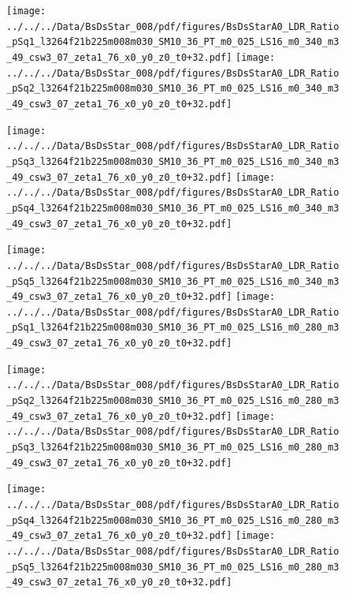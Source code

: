 \documentclass[a4paper,10pt]{article}
\begin{document}
\begin{figure}[p]
 \texttt{[image: ../../../Data/BsDsStar\_008/pdf/figures/BsDsStarA0\_LDR\_Ratio\_pSq1\_l3264f21b225m008m030\_SM10\_36\_PT\_m0\_025\_LS16\_m0\_340\_m3\_49\_csw3\_07\_zeta1\_76\_x0\_y0\_z0\_t0+32.pdf]} 
 \texttt{[image: ../../../Data/BsDsStar\_008/pdf/figures/BsDsStarA0\_LDR\_Ratio\_pSq2\_l3264f21b225m008m030\_SM10\_36\_PT\_m0\_025\_LS16\_m0\_340\_m3\_49\_csw3\_07\_zeta1\_76\_x0\_y0\_z0\_t0+32.pdf]} 
 \end{figure}
\begin{figure}[p]
 \texttt{[image: ../../../Data/BsDsStar\_008/pdf/figures/BsDsStarA0\_LDR\_Ratio\_pSq3\_l3264f21b225m008m030\_SM10\_36\_PT\_m0\_025\_LS16\_m0\_340\_m3\_49\_csw3\_07\_zeta1\_76\_x0\_y0\_z0\_t0+32.pdf]} 
 \texttt{[image: ../../../Data/BsDsStar\_008/pdf/figures/BsDsStarA0\_LDR\_Ratio\_pSq4\_l3264f21b225m008m030\_SM10\_36\_PT\_m0\_025\_LS16\_m0\_340\_m3\_49\_csw3\_07\_zeta1\_76\_x0\_y0\_z0\_t0+32.pdf]} 
 \end{figure}
\begin{figure}[p]
 \texttt{[image: ../../../Data/BsDsStar\_008/pdf/figures/BsDsStarA0\_LDR\_Ratio\_pSq5\_l3264f21b225m008m030\_SM10\_36\_PT\_m0\_025\_LS16\_m0\_340\_m3\_49\_csw3\_07\_zeta1\_76\_x0\_y0\_z0\_t0+32.pdf]} 
 \texttt{[image: ../../../Data/BsDsStar\_008/pdf/figures/BsDsStarA0\_LDR\_Ratio\_pSq1\_l3264f21b225m008m030\_SM10\_36\_PT\_m0\_025\_LS16\_m0\_280\_m3\_49\_csw3\_07\_zeta1\_76\_x0\_y0\_z0\_t0+32.pdf]} 
 \end{figure}
\clearpage
\begin{figure}[p]
 \texttt{[image: ../../../Data/BsDsStar\_008/pdf/figures/BsDsStarA0\_LDR\_Ratio\_pSq2\_l3264f21b225m008m030\_SM10\_36\_PT\_m0\_025\_LS16\_m0\_280\_m3\_49\_csw3\_07\_zeta1\_76\_x0\_y0\_z0\_t0+32.pdf]} 
 \texttt{[image: ../../../Data/BsDsStar\_008/pdf/figures/BsDsStarA0\_LDR\_Ratio\_pSq3\_l3264f21b225m008m030\_SM10\_36\_PT\_m0\_025\_LS16\_m0\_280\_m3\_49\_csw3\_07\_zeta1\_76\_x0\_y0\_z0\_t0+32.pdf]} 
 \end{figure}
\begin{figure}[p]
 \texttt{[image: ../../../Data/BsDsStar\_008/pdf/figures/BsDsStarA0\_LDR\_Ratio\_pSq4\_l3264f21b225m008m030\_SM10\_36\_PT\_m0\_025\_LS16\_m0\_280\_m3\_49\_csw3\_07\_zeta1\_76\_x0\_y0\_z0\_t0+32.pdf]} 
 \texttt{[image: ../../../Data/BsDsStar\_008/pdf/figures/BsDsStarA0\_LDR\_Ratio\_pSq5\_l3264f21b225m008m030\_SM10\_36\_PT\_m0\_025\_LS16\_m0\_280\_m3\_49\_csw3\_07\_zeta1\_76\_x0\_y0\_z0\_t0+32.pdf]} 
 \end{figure}
\clearpage
\end{document}
